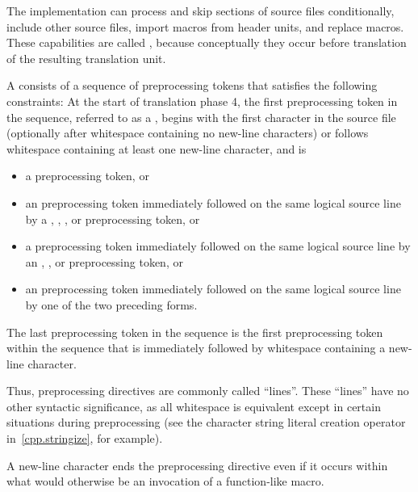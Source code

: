 \begin{bnf}
\br
\end{bnf}

\pnum
The implementation can
process and skip sections of source files conditionally,
include other source files,
import macros from header units,
and replace macros.
These capabilities are called
,
because conceptually they occur
before translation of the resulting translation unit.

\pnum
A  consists of a sequence of preprocessing tokens
that satisfies the following constraints:
At the start of translation phase 4,
the first preprocessing token in the sequence,
referred to as a ,
begins with the first character in the source file
(optionally after whitespace containing no new-line characters) or
follows whitespace containing at least one new-line character,
and is

\begin{itemize}
\item
a \tcode{\#} preprocessing token, or

\item
an  preprocessing token
immediately followed on the same logical source line by a
,
\tcode{<},
, or
\tcode{:}
preprocessing token, or

\item
a  preprocessing token
immediately followed on the same logical source line by an
,
\tcode{:}, or
\tcode{;}
preprocessing token, or

\item
an  preprocessing token
immediately followed on the same logical source line by
one of the two preceding forms.
\end{itemize}

The last preprocessing token in the sequence is the first preprocessing token within the sequence that
is immediately followed by whitespace containing a new-line character.
\begin{footnote}
Thus,
preprocessing directives are commonly called ``lines''.
These ``lines'' have no other syntactic significance,
as all whitespace is equivalent except in certain situations
during preprocessing (see the
\tcode{\#}
character string literal creation operator in~\ref{cpp.stringize}, for example).
\end{footnote}
\begin{note}
A new-line character ends the preprocessing directive even if it occurs
within what would otherwise be an invocation of a function-like macro.
\end{note}

